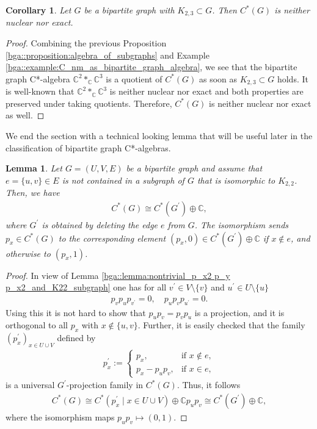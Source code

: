 \documentclass[a4paper]{amsart}
\newtheorem{lemma}[thm]{Lemma}
\newtheorem{corollary}[thm]{Corollary}
\newcommand{\C}{\mathbb{C}}
\begin{document}
\begin{corollary}
    \label{bga::corollary:K23_implies_not_nuclear}
    Let $G$ be a bipartite graph with $K_{2,3} \subset G$. Then $C^\ast(G)$ is neither nuclear nor exact.
\end{corollary}

\begin{proof}
    Combining the previous Proposition \ref{bga::proposition:algebra_of_subgraphs} and Example \ref{bga::example:C_nm_as_bipartite_graph_algebra}, we see that the bipartite graph C*-algebra $\C^2 *_\C \C^3$ is a quotient of $C^\ast(G)$ as soon as $K_{2,3} \subset G$ holds. It is well-known that $\C^2 *_\C \C^3$ is neither nuclear nor exact and both properties are preserved under taking quotients. Therefore, $C^\ast(G)$ is neither nuclear nor exact as well.
\end{proof}

We end the section with a technical looking lemma that will be useful later in the classification of bipartite graph C*-algebras.

\begin{lemma}
    \label{bga::lemma:loose_edge_gives_direct_summand_C}
    Let $G = (U, V, E)$ be a bipartite graph and assume that $e = \{u, v\} \in E$ is not contained in a subgraph of $G$ that is isomorphic to $K_{2,2}$. Then, we have
    \begin{align*}
        C^\ast(G) \cong C^\ast(G^\prime) \oplus \C,
    \end{align*}
    where $G^\prime$ is obtained by deleting the edge $e$ from $G$. The isomorphism sends $p_x \in C^\ast(G)$ to the corresponding element $(p_x, 0) \in C^\ast(G^\prime) \oplus \C$ if $x \not \in e$, and otherwise to $(p_x,1)$.
\end{lemma}

\begin{proof}
    In view of Lemma \ref{bga::lemma:nontrivial_p_x2 p_y p_x2_and_K22_subgraph} one has for all $v^\prime \in V \setminus \{v\}$ and $u^\prime \in U \setminus \{u\}$
    \begin{align*}
        p_v p_u p_{v^\prime} = 0,
        \quad 
        p_u p_v p_{u^\prime} = 0.
    \end{align*}
    Using this it is not hard to show that $p_u p_v = p_v p_u$ is a projection, and it is orthogonal to all $p_x$ with $x \not \in \{u,v\}$.
    Further, it is easily checked that the family $(p_x^\prime)_{x \in U \cup V}$ defined by
    \begin{align*}
        p^\prime_x := \begin{cases}
            p_x, &\text{if } x \not \in e, \\
            p_x - p_u p_v, &\text{if } x \in e,
        \end{cases}
    \end{align*}
    is a universal $G^\prime$-projection family in $C^\ast(G)$. Thus, it follows
    \begin{align*}
        C^\ast(G) \cong C^\ast(p^\prime_x\mid x \in U \cup V) \oplus \C p_{u}p_v \cong C^\ast(G^\prime) \oplus \C,
    \end{align*}
    where the isomorphism maps $p_u p_v \mapsto (0, 1)$.
\end{proof}
\end{document}
